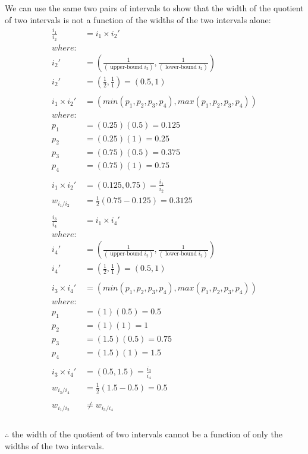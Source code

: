 \documentclass{report}
\newcommand{\?}{\stackrel{?}{=}}
\newcommand{\<}{\stackrel{?}{<}}
\begin{document}
We can use the same two pairs of intervals to show that the width of the quotient of two intervals is not a function of the widths of the two intervals alone:
\begin{align}
\frac{i_1}{i_2} &= i_1\times i_2'\\
where:\\
i_2' &=  \left(\frac{1}{(\operatorname{upper-bound} i_2)}, \frac{1}{(\operatorname{lower-bound} i_2)}\right)\\
i_2' &=  \left(\frac{1}{2}, \frac{1}{1}\right) = (0.5, 1)\\
\\
i_1\times i_2' &= (min(p_1, p_2, p_3, p_4), max(p_1, p_2, p_3, p_4))\\
where:\\
p_1 &= (0.25)(0.5) = 0.125\\
p_2 &= (0.25)(1) = 0.25\\
p_3 &= (0.75)(0.5) = 0.375\\
p_4 &= (0.75)(1) = 0.75\\
\\
i_1\times i_2' &= (0.125, 0.75)= \frac{i_1}{i_2}\\
w_{i_1/ i_2} &= \frac{1}{2}(0.75 - 0.125) = 0.3125\\
\\
\frac{i_3}{i_4} &= i_1\times i_4'\\
where:\\
i_4' &=  \left(\frac{1}{(\operatorname{upper-bound} i_2)}, \frac{1}{(\operatorname{lower-bound} i_2)}\right)\\
i_4' &=  \left(\frac{1}{2}, \frac{1}{1}\right) = (0.5, 1)\\
\\
i_3\times i_4' &= (min(p_1, p_2, p_3, p_4), max(p_1, p_2, p_3, p_4))\\
where:\\
p_1 &= (1)(0.5) = 0.5\\
p_2 &= (1)(1) = 1\\
p_3 &= (1.5)(0.5) = 0.75\\
p_4 &= (1.5)(1) = 1.5\\
\\
i_3\times i_4' &= (0.5, 1.5) = \frac{i_3}{i_4}\\
w_{i_3/ i_4} &= \frac{1}{2}(1.5 - 0.5) = 0.5\\
\\
w_{i_1/i_2} &\neq w_{i_3/i_4}\\
\end{align}\\
$\therefore$ the width of the quotient of two intervals cannot be a function of only the widths of the two intervals.
\end{document}
